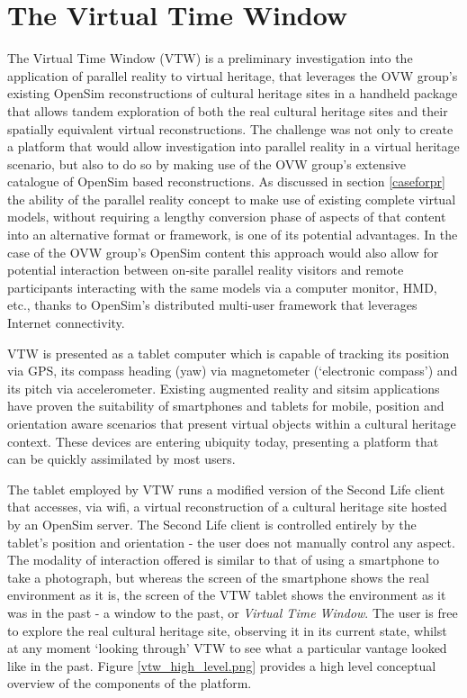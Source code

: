 
\section{The Virtual Time Window}
\label{the-virtual-time-window}
The Virtual Time Window (VTW) is a preliminary investigation into the application of parallel reality to virtual heritage, that leverages the OVW group's existing OpenSim reconstructions of cultural heritage sites in a handheld package that allows tandem exploration of both the real cultural heritage sites and their spatially equivalent virtual reconstructions. The challenge was not only to create a platform that would allow investigation into parallel reality in a virtual heritage scenario, but also to do so by making use of the OVW group's extensive catalogue of OpenSim based reconstructions. As discussed in section \ref{caseforpr} the ability of the parallel reality concept to make use of existing complete virtual models, without requiring a lengthy conversion phase of aspects of that content into an alternative format or framework, is one of its potential advantages. In the case of the OVW group's OpenSim content this approach would also allow for potential interaction between on-site parallel reality visitors and remote participants interacting with the same models via a computer monitor, HMD, etc., thanks to OpenSim's distributed multi-user framework that leverages Internet connectivity.

VTW is presented as a tablet computer which is capable of tracking its position via GPS, its compass heading (yaw) via magnetometer (`electronic compass') and its pitch via accelerometer. Existing augmented reality and sitsim applications have proven the suitability of smartphones and tablets for mobile, position and orientation aware scenarios that present virtual objects within a cultural heritage context. These devices are entering ubiquity today, presenting a platform that can be quickly assimilated by most users.

The tablet employed by VTW runs a modified version of the Second Life client that accesses, via wifi, a virtual reconstruction of a cultural heritage site hosted by an OpenSim server. The Second Life client is controlled entirely by the tablet's position and orientation - the user does not manually control any aspect. The modality of interaction offered is similar to that of using a smartphone to take a photograph, but whereas the screen of the smartphone shows the real environment as it is, the screen of the VTW tablet shows the environment as it was in the past - a window to the past, or \textit{Virtual Time Window}. The user is free to explore the real cultural heritage site, observing it in its current state, whilst at any moment `looking through' VTW to see what a particular vantage looked like in the past. Figure \ref{vtw_high_level.png} provides a high level conceptual overview of the components of the platform.

